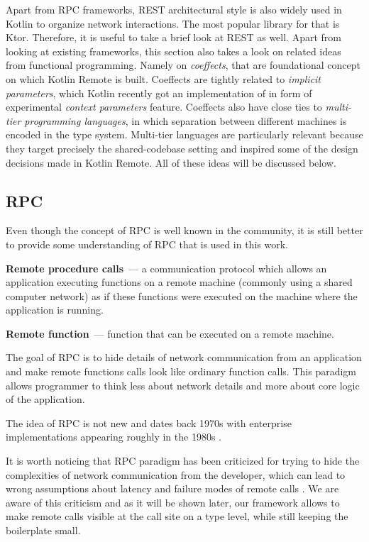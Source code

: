 \documentclass[a4paper,11pt,oneside]{article}
\newcommand{\term}[1]{\textit{#1}}
\newcommand{\makedefinition}[3][]{\textbf{#2}\ifthenelse{\equal{#1}{}}{}{~(#1)}~--- #3.}
\begin{document}
Apart from RPC frameworks, REST architectural style is also widely used in Kotlin to organize
network interactions. The most popular library for that is Ktor. Therefore, it is useful to take a
brief look at REST as well. Apart from looking at existing frameworks, this section also takes a
look on related ideas from functional programming. Namely on \term{coeffects}, that are
foundational concept on which Kotlin Remote is built. Coeffects are tightly related to
\term{implicit parameters}, which Kotlin recently got an implementation of in form of experimental
\term{context parameters} feature. Coeffects also have close ties to \term{multi-tier programming
languages}, in which separation between different machines is encoded in the type system.
Multi-tier languages are particularly relevant because they target precisely the shared-codebase
setting and inspired some of the design decisions made in Kotlin Remote. All of these ideas will
be discussed below.

\subsection{RPC}

Even though the concept of RPC is well known in the community, it is still better to provide some
understanding of RPC that is used in this work.

\makedefinition[RPC]{Remote procedure calls}{a communication protocol which allows an application
executing functions on a remote machine (commonly using a shared computer network) as if these 
functions were executed on the machine where the application is running}

\makedefinition{Remote function}{function that can be executed on a remote machine}

The goal of RPC is to hide details of network communication from an application and make remote 
functions calls look like ordinary function calls. This paradigm allows programmer to think less about
network details and more about core logic of the application. 

The idea of RPC is not new and dates back 1970s \cite{white_high-level_1976} with enterprise 
implementations appearing roughly in the 1980s \cite{birrell_implementing_1984}.

It is worth noticing that RPC paradigm has been criticized for trying to hide the complexities of
network communication from the developer, which can lead to wrong assumptions about latency and
failure modes of remote calls \cite{tanenbaum_critique_nodate}. We are aware of this criticism
and as it will be shown later, our framework allows to make remote calls visible at the call site
on a type level, while still keeping the boilerplate small.
\end{document}
